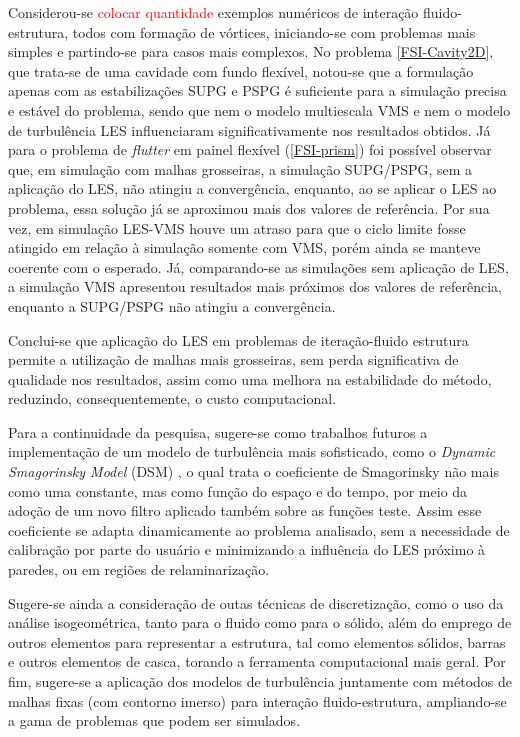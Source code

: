 Considerou-se \textcolor{red}{colocar quantidade} exemplos numéricos de interação fluido-estrutura, todos com formação de vórtices, iniciando-se com problemas mais simples e partindo-se para casos mais complexos. No problema \ref{FSI-Cavity2D}, que trata-se de uma cavidade com fundo flexível, notou-se que a formulação apenas com as estabilizações SUPG e PSPG é suficiente para a simulação precisa e estável do problema, sendo que nem o modelo multiescala VMS e nem o modelo de turbulência LES influenciaram  significativamente nos resultados obtidos. Já para o problema de \textit{flutter} em painel flexível (\ref{FSI-prism}) foi possível observar que, em simulação com malhas grosseiras, a simulação SUPG/PSPG, sem a aplicação do LES, não atingiu a convergência, enquanto, ao se aplicar o LES ao problema, essa solução já se aproximou mais dos valores de referência. Por sua vez, em simulação LES-VMS houve um atraso para que o ciclo limite fosse atingido em relação à simulação somente com VMS, porém ainda se manteve coerente com o esperado. Já, comparando-se as simulações sem aplicação de LES, a simulação VMS apresentou resultados mais próximos dos valores de referência, enquanto a SUPG/PSPG não atingiu a convergência.

Conclui-se que aplicação do LES em problemas de iteração-fluido estrutura permite a utilização de malhas mais grosseiras, sem perda significativa de qualidade nos resultados, assim como uma melhora na estabilidade do método, reduzindo, consequentemente, o custo computacional.

Para a continuidade da pesquisa, sugere-se como trabalhos futuros a implementação de um modelo de turbulência mais sofisticado, como o \textit{Dynamic Smagorinsky Model} (DSM) \cite{germano1991dynamic}, o qual trata o coeficiente de Smagorinsky não mais como uma constante, mas como função do espaço e do tempo, por meio da adoção de um novo filtro aplicado também sobre as funções teste. Assim esse coeficiente se adapta dinamicamente ao problema analisado, sem a necessidade de calibração por parte do usuário e minimizando a influência do LES próximo à paredes, ou em regiões de relaminarização.

Sugere-se ainda a consideração de outas técnicas de discretização, como o uso da análise isogeométrica, tanto para o fluido como para o sólido, além do emprego de outros elementos para representar a estrutura, tal como elementos sólidos, barras e outros elementos de casca, torando a ferramenta computacional mais geral. Por fim, sugere-se a aplicação dos modelos de turbulência juntamente com métodos de malhas fixas (com contorno imerso) para interação fluido-estrutura, ampliando-se a gama de problemas que podem ser simulados.